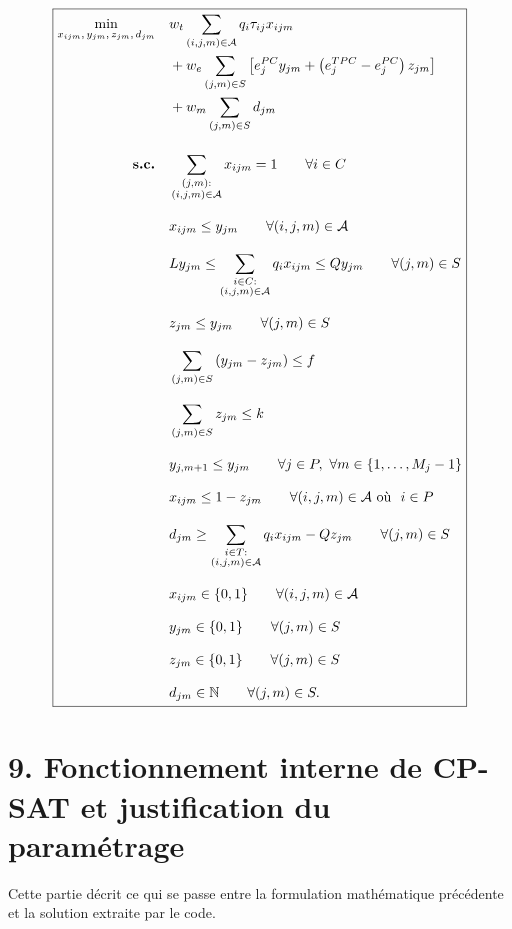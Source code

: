 \documentclass[11pt,a4paper]{article}
\begin{document}
\[
\boxed{
\begin{aligned}
\min_{\substack{
x_{ijm},\, y_{jm},\, z_{jm},\, d_{jm}
}}
\quad
&
w_t
\sum_{(i,j,m)\in \mathcal{A}}
q_i \tau_{ij} x_{ijm}
\\
&+
w_e
\sum_{(j,m)\in S}
\left[
e_j^{PC} y_{jm}
+
\left(e_j^{TPC}-e_j^{PC}\right) z_{jm}
\right]
\\
&+
w_m
\sum_{(j,m)\in S}
d_{jm}
\\[0.4cm]
\text{\textbf{s.c.}}
\quad
&
\sum_{\substack{(j,m) :\\ (i,j,m)\in \mathcal{A}}}
x_{ijm}
=
1
\qquad
\forall i \in C
\\[0.3cm]
&
x_{ijm}
\leq
y_{jm}
\qquad
\forall (i,j,m)\in \mathcal{A}
\\[0.3cm]
&
L y_{jm}
\leq
\sum_{\substack{i\in C :\\ (i,j,m)\in \mathcal{A}}}
q_i x_{ijm}
\leq
Q y_{jm}
\qquad
\forall (j,m)\in S
\\[0.3cm]
&
z_{jm}
\leq
y_{jm}
\qquad
\forall (j,m)\in S
\\[0.3cm]
&
\sum_{(j,m)\in S}
\left(y_{jm}-z_{jm}\right)
\leq
f
\\[0.3cm]
&
\sum_{(j,m)\in S}
z_{jm}
\leq
k
\\[0.3cm]
&
y_{j,m+1}
\leq
y_{jm}
\qquad
\forall j \in P,\ \forall m \in \{1,\dots,M_j-1\}
\\[0.3cm]
&
x_{ijm}
\leq
1-z_{jm}
\qquad
\forall (i,j,m)\in \mathcal{A}\text{ où }\ i \in P
\\[0.3cm]
&
d_{jm}
\geq
\sum_{\substack{i\in T :\\ (i,j,m)\in \mathcal{A}}}
q_i x_{ijm}
-
Q z_{jm}
\qquad
\forall (j,m)\in S
\\[0.3cm]
&
x_{ijm}
\in
\{0,1\}
\qquad
\forall (i,j,m)\in \mathcal{A}
\\[0.3cm]
&
y_{jm}
\in
\{0,1\}
\qquad
\forall (j,m)\in S
\\[0.3cm]
&
z_{jm}
\in
\{0,1\}
\qquad
\forall (j,m)\in S
\\[0.3cm]
&
d_{jm}
\in
\mathbb{N}
\qquad
\forall (j,m)\in S.
\end{aligned}
}
\]

\newpage
\section{9. Fonctionnement interne de CP-SAT et justification du paramétrage}

Cette partie décrit ce qui se passe entre la formulation mathématique précédente et la solution extraite par le code. \cite{ortools-cpsat,ortools-limits,krupke-cpsat-primer}
\end{document}
